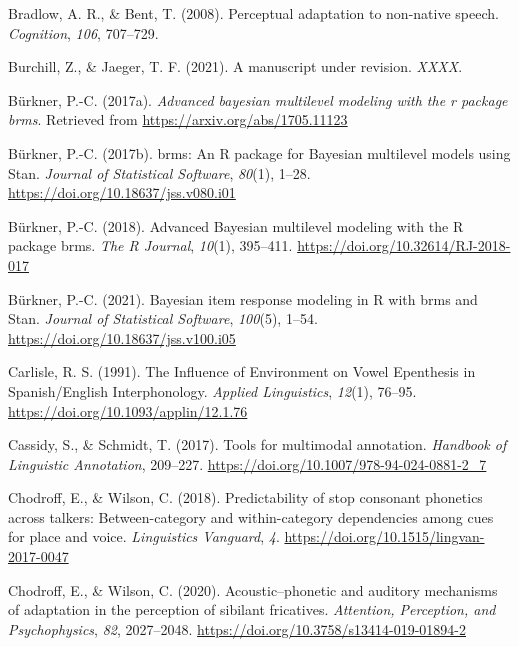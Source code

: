 \documentclass[
  11pt,
  english,
  man,floatsintext]{apa6}
\newlength{\cslhangindent}
\newlength{\cslentryspacingunit} %
\newenvironment{CSLReferences}[2] %
 {%
  \setlength{\parindent}{0pt}
  \ifodd #1
  \let\oldpar\par
  \def\par{\hangindent=\cslhangindent\oldpar}
  \fi
  \setlength{\parskip}{#2\cslentryspacingunit}
 }%
 {}
\begin{document}
\begin{CSLReferences}{1}{0}
\leavevmode{}%
Bradlow, A. R., \& Bent, T. (2008). Perceptual adaptation to non-native speech. \emph{Cognition}, \emph{106}, 707--729.

\leavevmode{}%
Burchill, Z., \& Jaeger, T. F. (2021). A manuscript under revision. \emph{XXXX}.

\leavevmode{}%
Bürkner, P.-C. (2017a). \emph{Advanced bayesian multilevel modeling with the r package brms}. Retrieved from \url{https://arxiv.org/abs/1705.11123}

\leavevmode{}%
Bürkner, P.-C. (2017b). {brms}: An {R} package for {Bayesian} multilevel models using {Stan}. \emph{Journal of Statistical Software}, \emph{80}(1), 1--28. \url{https://doi.org/10.18637/jss.v080.i01}

\leavevmode{}%
Bürkner, P.-C. (2018). Advanced {Bayesian} multilevel modeling with the {R} package {brms}. \emph{The R Journal}, \emph{10}(1), 395--411. \url{https://doi.org/10.32614/RJ-2018-017}

\leavevmode{}%
Bürkner, P.-C. (2021). Bayesian item response modeling in {R} with {brms} and {Stan}. \emph{Journal of Statistical Software}, \emph{100}(5), 1--54. \url{https://doi.org/10.18637/jss.v100.i05}

\leavevmode{}%
Carlisle, R. S. (1991). {The Influence of Environment on Vowel Epenthesis in Spanish/English Interphonology}. \emph{Applied Linguistics}, \emph{12}(1), 76--95. \url{https://doi.org/10.1093/applin/12.1.76}

\leavevmode{}%
Cassidy, S., \& Schmidt, T. (2017). Tools for multimodal annotation. \emph{Handbook of Linguistic Annotation}, 209--227. \url{https://doi.org/10.1007/978-94-024-0881-2_7}

\leavevmode{}%
Chodroff, E., \& Wilson, C. (2018). Predictability of stop consonant phonetics across talkers: Between-category and within-category dependencies among cues for place and voice. \emph{Linguistics Vanguard}, \emph{4}. \url{https://doi.org/10.1515/lingvan-2017-0047}

\leavevmode{}%
Chodroff, E., \& Wilson, C. (2020). Acoustic--phonetic and auditory mechanisms of adaptation in the perception of sibilant fricatives. \emph{Attention, Perception, and Psychophysics}, \emph{82}, 2027--2048. \url{https://doi.org/10.3758/s13414-019-01894-2}


\end{CSLReferences}
\end{document}
